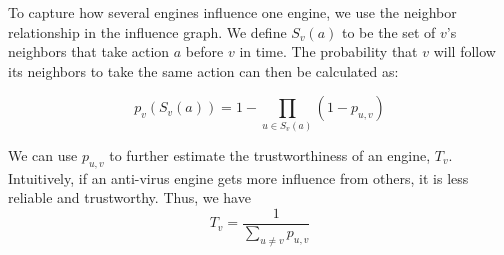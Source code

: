 To capture how several engines influence one engine, we use the neighbor relationship in the influence graph. 
We define $S_v(a)$ to be the set of $v$'s neighbors that take action $a$ before $v$ in time. 
The probability that $v$ will follow its neighbors to take the same action can then be calculated as:


\begin{equation} \label{eq:setp}
p_v(S_v(a)) = 1 - \prod\limits_{u \in S_v(a)}(1 - p_{u,v})
\end{equation}


We can use $p_{u,v}$ to further estimate the trustworthiness of an engine, $T_v$.
Intuitively, if an anti-virus engine gets more influence from others,
it is less reliable and trustworthy. Thus, we have
\vspace{-0.05in}
\begin{equation} \label{eq:trust}
T_v = \frac{1}{\sum\limits_{u \neq v}{p_{u,v}}}
\end{equation}
